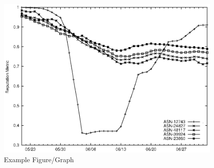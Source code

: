 \documentclass{sig-alternate}
\begin{document}
\begin{figure}[htb!]
	\begin{center}
		\includegraphics[width=0.75\linewidth]{some_graph}
	\end{center}
	\vspace{-12pt}
	\caption{Example Figure/Graph}
	\label{fig:some_graph}
\end{figure}
\end{document}
